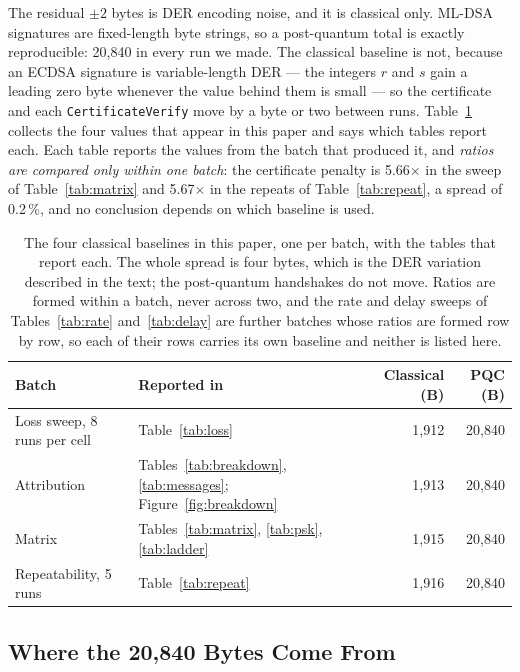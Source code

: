 \documentclass[drones,article,submit,pdftex,moreauthors]{Definitions/mdpi}
\newcommand{\mldsa}{ML-DSA}
\begin{document}
The residual $\pm 2$ bytes is DER encoding noise, and it is classical
only. \mldsa{} signatures are fixed-length byte strings, so a
post-quantum total is exactly reproducible: 20{,}840 in every run we
made. The classical baseline is not, because an ECDSA signature is
variable-length DER --- the integers $r$ and $s$ gain a leading zero
byte whenever the value behind them is small --- so the certificate and
each \texttt{CertificateVerify} move by a byte or two between runs.
Table~\ref{tab:batches} collects the four values that appear in this
paper and says which tables report each. Each table reports the values
from the batch that produced it, and \emph{ratios are compared only
within one batch}: the certificate penalty is 5.66$\times$ in the sweep
of Table~\ref{tab:matrix} and 5.67$\times$ in the repeats of
Table~\ref{tab:repeat}, a spread of 0.2\,\%, and no conclusion depends
on which baseline is used.

\begin{table}[H]
\caption{The four classical baselines in this paper, one per batch,
with the tables that report each. The whole spread is four bytes, which
is the DER variation described in the text; the post-quantum handshakes
do not move. Ratios are formed within a batch, never across two, and
the rate and delay sweeps of Tables~\ref{tab:rate} and~\ref{tab:delay}
are further batches whose ratios are formed row by row, so each of their
rows carries its own baseline and neither is listed here.}
\label{tab:batches}
\centering
\small
\begin{tabular}{llrr}
\toprule
Batch & Reported in & Classical (B) & PQC (B) \\
\midrule
Loss sweep, 8 runs per cell & Table~\ref{tab:loss} & 1{,}912 & 20{,}840 \\
Attribution                 & Tables~\ref{tab:breakdown}, \ref{tab:messages}; Figure~\ref{fig:breakdown} & 1{,}913 & 20{,}840 \\
Matrix                      & Tables~\ref{tab:matrix}, \ref{tab:psk}, \ref{tab:ladder} & 1{,}915 & 20{,}840 \\
Repeatability, 5 runs       & Table~\ref{tab:repeat} & 1{,}916 & 20{,}840 \\
\bottomrule
\end{tabular}
\end{table}

\subsection{Where the 20{,}840 Bytes Come From}
\label{sec:arithmetic}
\end{document}
